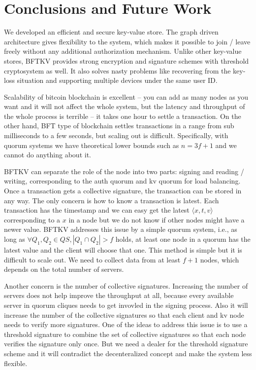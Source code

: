 \section{Conclusions and Future Work}
We developed an efficient and secure key-value store. The graph driven
architecture gives flexibility to the system, which makes it possible
to join / leave freely without any additional authorization
mechanism. Unlike other key-value stores, BFTKV provides strong
encryption and signature schemes with threshold cryptosystem as
well. It also solves nasty problems like recovering from the key-loss
situation and supporting multiple devices under the same user ID.

Scalability of bitcoin blockchain is excellent -- you can add as many
nodes as you want and it will not affect the whole system, but the
latency and throughput of the whole process is terrible -- it takes
one hour to settle a transaction.
On the other hand, BFT type of blockchain settles transactions in a
range from sub milliseconds to a few seconds, but scaling out is
difficult. Specifically, with quorum systems we have theoretical lower
bounds such as $n = 3f + 1$ and we cannot do anything about it.

BFTKV can separate the role of the node into two parts: signing and
reading / writing, corresponding to the auth quorum and kv quorum for
load balancing.
Once a transaction gets a collective signature, the transaction
can be stored in any way. The only concern is how to know a
transaction is latest. Each transaction has the timestamp and we can
easy get the latest $\langle x, t, v \rangle$ corresponding to a $x$
in a node but we do not know if other nodes might have a newer
value. BFTKV addresses this issue by a simple quorum system, i.e., as
long as $\forall Q_1, Q_2 \in QS, |Q_1 \cap Q_2| > f$ holds, at least
one node in a quorum has the latest value and the client will choose
that one. This method is simple but it is difficult to scale out. We
need to collect data from at least $f+1$ nodes, which depends on the
total number of servers.

Another concern is the number of collective signatures. Increasing the
number of servers does not help improve the throughput at all, because
every available server in quorum cliques needs to get invovled in
the signing process. Also it will increase the number of the
collective signatures so that each client and kv node needs to verify
more signatures.
One of the ideas to address this issue is to use a threshold signature
to combine the set of collective signatures so that each node verifies
the signature only once. But we need a dealer for the threshold
signature scheme and it will contradict the decenteralized concept and
make the system less flexible.
